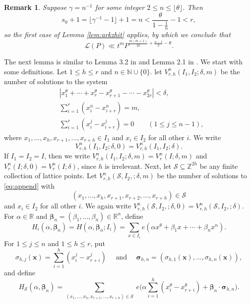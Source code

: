 \documentclass[11pt,reqno]{amsart}
\newtheorem{remark}{Remark}[section]
\numberwithin{equation}{section}
\begin{document}
\begin{remark} \label{rem:1}
Suppose $\gamma = n^{-1}$ for some integer $2 \leq n \leq \lfloor \theta \rfloor$. Then 
\[ s_0 + 1 = \lfloor \gamma^{-1}-1 \rfloor+1 = n < \frac{\theta}{1-\frac{1}{n}}-1 < r, \]
so the first case of Lemma \ref{lem:arkzhit} applies, by which we conclude that 
\[ \mathcal{L}(P) \ll t^m P^{\frac{m(m+1)}{2k}+\frac{n-1}{2}-\theta}. \]
\end{remark}

 
The next lemma is similar to Lemma 3.2 in \cite{Poulias1} and Lemma 2.1 in \cite{Watt}. We start with some definitions. Let $1 \leq h \leq r$ and $n \in \mathbb{N} \cup \{0\}$. let $V_{r,h}^n(I_1,I_2;\delta,m)$ be the number of solutions to the system 
\begin{equation} \label{eq:append}
\begin{aligned}
& |x_1^{\theta}+\cdots+x_r^{\theta}-x_{r+1}^{\theta}-\cdots-x_{2r}^{\theta}| < \delta, 
\\ 
& \sum_{i=1}^r (x_i^n-x_{i+r}^n) = m, 
\\ 
& \sum_{i=1}^r (x_i^j-x_{i+r}^j) = 0
\quad \quad (1 \leq j \leq n-1),
\end{aligned}
\end{equation}
where $x_1, \ldots,x_h, x_{r+1}, \ldots,x_{r+h} \in I_1$ and $x_i \in I_2$ for all other $i$. We write 
\[ V_{r,h}^n(I_1,I_2;\delta,0) = V_{r,h}^n(I_1,I_2;\delta). \] If $I_1 = I_2 = I$, then we write $V_{r,h}^n(I_1,I_2;\delta,m) = V_r^n(I;\delta,m)$ and $V_r^n(I;\delta,0) = V_r^n(I;\delta)$, since $h$ is irrelevant. Next, let $ \mathcal{S} \subseteq \mathbb{Z}^{2h}$ be any finite collection of lattice points. Let $V_{r,h}^n(\mathcal{S}, I_2,;\delta,m)$ be the number of solutions to \eqref{eq:append} with 
\[(x_1,\ldots, x_h, x_{r+1},x_{r+2},\ldots,x_{r+h}) \in \mathcal{S}\] 
and $x_i \in I_2$ for all other $i$. We again write $V_{r,h}^n(\mathcal{S}, I_2,;\delta,0) = V_{r,h}^n(\mathcal{S}, I_2,;\delta)$. 
For $\alpha \in \mathbb{R}$ and $\boldsymbol{\beta}_n = (\beta_1,\ldots,\beta_n) \in \mathbb{R}^n$, define 
\[ H_i(\alpha, \boldsymbol{\beta}_n) = H(\alpha, \boldsymbol{\beta}_n; I_i) = \sum_{x \in I_i} e(\alpha x^{\theta} +\beta_1x+\cdots+\beta_nx^n ). \]
For $1 \leq j \leq n$ and $1 \leq h \leq r$, put 
\[ \sigma_{h,j}(\mathbf{x}) = \sum_{i=1}^h (x_i^j-x_{r+i}^j) \quad \text{ and } \quad \boldsymbol{\sigma}_{h,n} = (\sigma_{h,1}(\mathbf{x}), \ldots, \sigma_{h,n}(\mathbf{x})), \]
and define 
\[ H_{\mathcal{S}}(\alpha, \boldsymbol{\beta}_n) = \sum_{(x_1,\ldots,x_h,x_{r+1},\ldots,x_{r+h}) \in \mathcal{S}} \ e\Big(\alpha\sum_{i=1}^h (x_i^{\theta}-x_{r+i}^{\theta})+\boldsymbol{\beta}_n\cdot \boldsymbol{\sigma}_{h,n} \Big). \]
\end{document}
